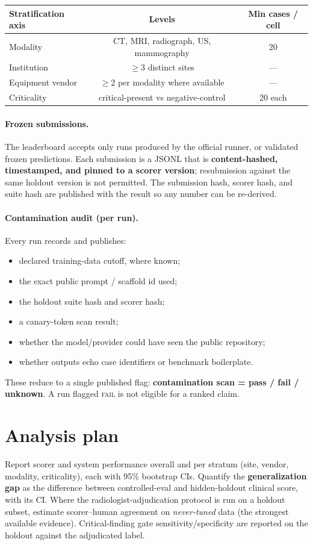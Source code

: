 \documentclass[11pt]{article}
\begin{document}
\begin{center}
\begin{tabular}{lcc}
\toprule
Stratification axis & Levels & Min cases / cell \\
\midrule
Modality & CT, MRI, radiograph, US, mammography & 20 \\
Institution & $\geq 3$ distinct sites & --- \\
Equipment vendor & $\geq 2$ per modality where available & --- \\
Criticality & critical-present vs negative-control & 20 each \\
\bottomrule
\end{tabular}
\end{center}

\paragraph{Frozen submissions.} The leaderboard accepts only runs produced by the official runner, or validated frozen predictions. Each submission is a JSONL that is \textbf{content-hashed, timestamped, and pinned to a scorer version}; resubmission against the same holdout version is not permitted. The submission hash, scorer hash, and suite hash are published with the result so any number can be re-derived.

\paragraph{Contamination audit (per run).} Every run records and publishes:
\begin{itemize}[leftmargin=*,nosep]
\item declared training-data cutoff, where known;
\item the exact public prompt / scaffold id used;
\item the holdout suite hash and scorer hash;
\item a canary-token scan result;
\item whether the model/provider could have seen the public repository;
\item whether outputs echo case identifiers or benchmark boilerplate.
\end{itemize}
These reduce to a single published flag: \textbf{contamination scan = pass / fail / unknown}. A run flagged \textsc{fail} is not eligible for a ranked claim.

\section{Analysis plan}
Report scorer and system performance overall and per stratum (site, vendor, modality, criticality), each with 95\% bootstrap CIs. Quantify the \textbf{generalization gap} as the difference between controlled-eval and hidden-holdout clinical score, with its CI. Where the radiologist-adjudication protocol is run on a holdout subset, estimate scorer--human agreement on \emph{never-tuned} data (the strongest available evidence). Critical-finding gate sensitivity/specificity are reported on the holdout against the adjudicated label.
\end{document}
